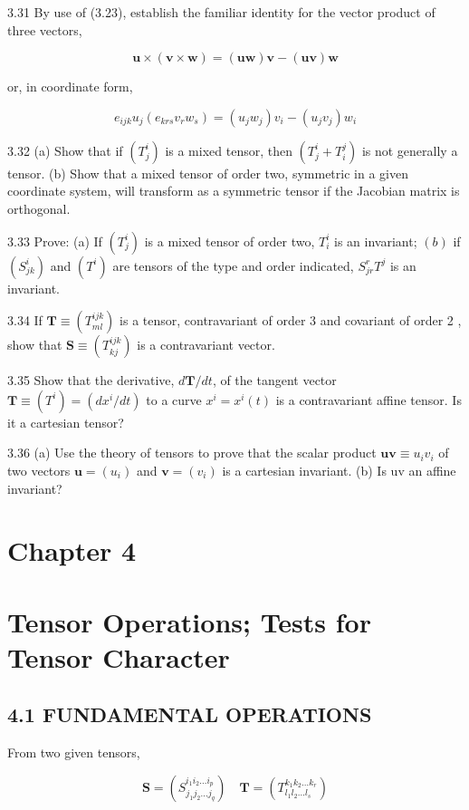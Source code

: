 \documentclass[10pt]{article}
\begin{document}
3.31 By use of (3.23), establish the familiar identity for the vector product of three vectors,

$$
\mathbf{u} \times(\mathbf{v} \times \mathbf{w})=(\mathbf{u w}) \mathbf{v}-(\mathbf{u v}) \mathbf{w}
$$

or, in coordinate form,

$$
e_{i j k} u_{j}\left(e_{k r s} v_{r} w_{s}\right)=\left(u_{j} w_{j}\right) v_{i}-\left(u_{j} v_{j}\right) w_{i}
$$

3.32 (a) Show that if $\left(T_{j}^{i}\right)$ is a mixed tensor, then $\left(T_{j}^{i}+T_{i}^{j}\right)$ is not generally a tensor. (b) Show that a mixed tensor of order two, symmetric in a given coordinate system, will transform as a symmetric tensor if the Jacobian matrix is orthogonal.

3.33 Prove: (a) If $\left(T_{j}^{i}\right)$ is a mixed tensor of order two, $T_{i}^{i}$ is an invariant; $(b)$ if $\left(S_{j k}^{i}\right)$ and $\left(T^{i}\right)$ are tensors of the type and order indicated, $S_{j r}^{r} T^{j}$ is an invariant.

3.34 If $\mathbf{T} \equiv\left(T_{m l}^{i j k}\right)$ is a tensor, contravariant of order 3 and covariant of order 2 , show that $\mathbf{S} \equiv\left(T_{k j}^{i j k}\right)$ is a contravariant vector.

3.35 Show that the derivative, $d \mathbf{T} / d t$, of the tangent vector $\mathbf{T} \equiv\left(T^{i}\right)=\left(d x^{i} / d t\right)$ to a curve $x^{i}=x^{i}(t)$ is a contravariant affine tensor. Is it a cartesian tensor?

3.36 (a) Use the theory of tensors to prove that the scalar product $\mathbf{u v} \equiv u_{i} v_{i}$ of two vectors $\mathbf{u}=\left(u_{i}\right)$ and $\mathbf{v}=\left(v_{i}\right)$ is a cartesian invariant. (b) Is uv an affine invariant?

\section*{Chapter 4}
\section*{Tensor Operations; Tests for Tensor Character}
\subsection*{4.1 FUNDAMENTAL OPERATIONS}
From two given tensors,


\begin{equation*}
\mathbf{S}=\left(S_{j_{1} j_{2} \ldots j_{q}}^{i_{1} i_{2} \ldots i_{p}}\right) \quad \mathbf{T}=\left(T_{l_{1} l_{2} \ldots l_{s}}^{k_{1} k_{2} \ldots k_{r}}\right) \tag{4.1}
\end{equation*}
\end{document}
